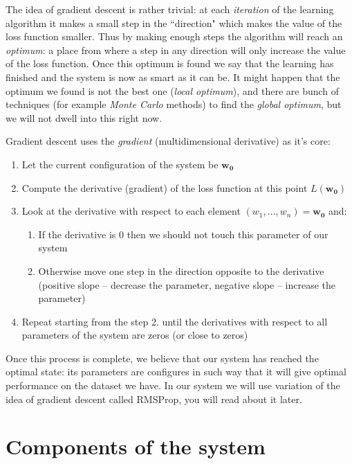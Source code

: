 \documentclass[a4paper,12pt]{article}
\begin{document}
The idea of gradient descent is rather trivial: at each \emph{iteration} of the learning algorithm it makes a small step in the ``direction" which makes the value of the loss function smaller. Thus by making enough steps the algorithm will reach an \emph{optimum}: a place from where a step in any direction will only increase the value of the loss function. Once this optimum is found we say that the learning has finished and the system is now as smart as it can be. It might happen that the optimum we found is not the best one (\emph{local optimum}), and there are bunch of techniques (for example \emph{Monte Carlo} methods) to find the \emph{global optimum}, but we will not dwell into this right now. 

Gradient descent uses the \emph{gradient} (multidimensional derivative) as it's core:
\begin{enumerate}
	\item Let the current configuration of the system be $\mathbf{w_0}$
	\item Compute the derivative (gradient) of the loss function at this point $L(\mathbf{w_0})$
	\item Look at the derivative with respect to each element $(w_1, \ldots, w_n) = \mathbf{w_0}$ and:
	\begin{enumerate}
		\item If the derivative is 0 then we should not touch this parameter of our system
		\item Otherwise move one step in the direction opposite to the derivative (positive slope -- decrease the parameter, negative slope -- increase the parameter)
	\end{enumerate}
	\item Repeat starting from the step 2. until the derivatives with respect to all parameters of the system are zeros (or close to zeros)
\end{enumerate}
Once this process is complete, we believe that our system has reached the optimal state: its parameters are configures in such way that it will give optimal performance on the dataset we have. In our system we will use variation of the idea of gradient descent called RMSProp, you will read about it later.



%
%
\pagebreak
\section{Components of the system}
\end{document}
